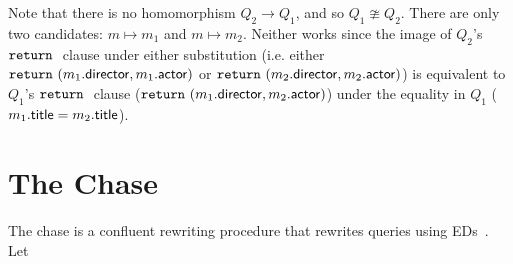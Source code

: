 \documentclass[preprint]{sigplanconf}
\newcommand{\RETURN}{{\tt return} \ }
\begin{document}
Note that there is no homomorphism $Q_2 \to Q_1$, and so $Q_1 \ncong Q_2$.  
There are only two candidates: $m \mapsto m_1$ and $m \mapsto m_2$.  
Neither works since the image of $Q_2$'s $\RETURN$ clause under either substitution (i.e. either $\RETURN (m_1.{\sf director}, m_1.{\sf actor})$ or $\RETURN (m_2.{\sf director}, m_2.{\sf actor})$) is equivalent to $Q_1$'s $\RETURN$ clause ($\RETURN (m_1.{\sf director}, m_2.{\sf actor})$) under the equality in $Q_1$ ($m_1.{\sf title} = m_2.{\sf title}$).

%
%


\section{The Chase}
\label{sec:chase}

The chase is a confluent rewriting procedure that rewrites queries using EDs~\cite{foundations}.   Let
\end{document}
